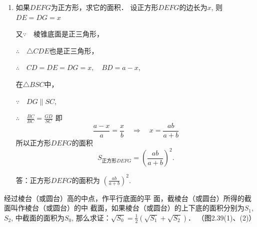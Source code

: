 \begin{solution}
\begin{enumerate}
\item 如果$DEFG$为正方形，求它的面积．
设正方形$DEFG$的边长为$x$, 则
$DE=DG=x$

又$\because\quad $棱锥底面是正三角形，

$\therefore\quad \triangle  CDE$也是正三角形，

$\therefore\quad CD=DE=DG=x,\quad BD=a-x$,

在$\triangle BSC$中，

$\because\quad DG\parallel SC$,

$\therefore\quad \frac{BC}{BC}=\frac{GD}{SC}$
即
\[\frac{a-x}{a}=\frac{x}{b}\quad \Rightarrow\quad x=\frac{ab}{a+b}\]
所以正方形$DEFG$的面积
\[S_{\text{正方形}DEFG}=\left(\frac{ab}{a+b}\right)^2.\]

答：正方形$DEFG$的面积为
$\left(\frac{ab}{a+b}\right)^2$.
\end{enumerate}
\end{solution}

\begin{example}
    经过棱台（或圆台）高的中点，作平行底面的平
面，截棱台（或圆台）所得的截面叫作棱台（或圆台）的中
截面，如果棱台（或圆台）的上下底的面积分别为$S_1$, $S_2$,
中截面的面积为$S_0$, 那么求证：$\sqrt{S_0}=\frac{1}{2}\left(\sqrt{S_1}+\sqrt{S_2}\right)$．
（图2.39(1)、(2)）
\end{example}

